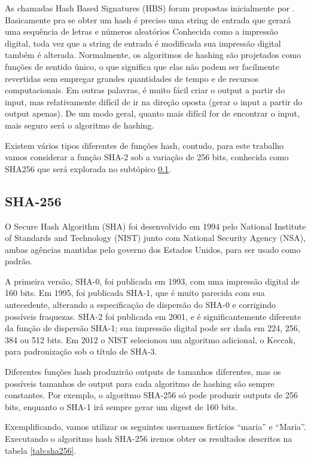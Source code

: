 \documentclass[12pt, a4paper]{report}
\begin{document}
As chamadas Hash Based Signatures (HBS) foram propostas inicialmente por \cite{lamport1979constructing}. Basicamente pra se obter um hash é preciso uma string de entrada  que gerará uma sequência de letras e números aleatórios Conhecida como a impressão digital, toda vez que a string de entrada é modificada sua impressão digital também é alterada.
Normalmente, os algoritmos de hashing  são projetados como funções de sentido único, o que significa que elas não podem ser facilmente revertidas sem empregar grandes quantidades de tempo e de recursos computacionais. Em outras palavras, é muito fácil criar o output a partir do input, mas relativamente difícil de ir na direção oposta (gerar o input a partir do output apenas). De um modo geral, quanto mais difícil for de encontrar o input, mais seguro será o algoritmo de hashing.

Existem vários tipos diferentes de funções hash, contudo, para este trabalho vamos considerar a função SHA-2 sob a variação de 256 bits, conhecida como SHA256 que será explorada no subtópico \ref{subsec:sha256}.

\subsection{SHA-256}
\label{subsec:sha256}

O Secure Hash Algorithm (SHA) foi desenvolvido em 1994 pelo National Institute of Standards and Technology (NIST) junto com National Security Agency (NSA), ambas agências mantidas pelo governo dos Estados Unidos,  para ser usado como padrão.

A primeira versão, SHA-0, foi publicada em 1993, com uma impressão digital de 160 bits. Em 1995, foi publicada SHA-1, que é muito parecida com sua antecedente, alterando a especificação de dispersão do SHA-0 e corrigindo possíveis fraquezas. SHA-2 foi publicada em 2001, e é significantemente diferente da função de dispersão SHA-1; sua impressão digital pode ser dada em 224, 256, 384 ou 512 bits. Em 2012 o NIST selecionou um algoritmo adicional, o Keccak, para padronização sob o título de SHA-3.

Diferentes funções hash produzirão outputs de tamanhos diferentes, mas os possíveis tamanhos de output para cada algoritmo de hashing são sempre constantes. Por exemplo, o algoritmo SHA-256 só pode produzir outputs de 256 bits, enquanto o SHA-1 irá sempre gerar um digest de 160 bits.

Exemplificando, vamos utilizar os seguintes usernames fictícios “maria” e “Maria”. Executando o algoritmo hash SHA-256 iremos obter os resultados descritos na tabela \ref{tab:sha256}.
\end{document}
